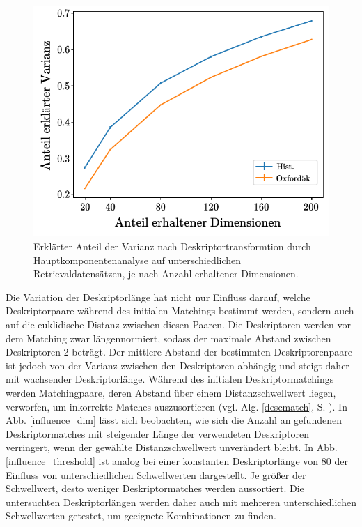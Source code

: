 \begin{figure}[h]
\centering
\includegraphics[scale=1]{explained_variance.pdf}
\caption{Erklärter Anteil der Varianz nach Deskriptortransformtion durch Hauptkomponentenanalyse auf unterschiedlichen Retrievaldatensätzen, je nach Anzahl erhaltener Dimensionen.}
\label{explained_variance_ratio}
\end{figure}
Die Variation der Deskriptorlänge hat nicht nur Einfluss darauf, welche Deskriptorpaare während des initialen Matchings bestimmt werden, sondern auch auf die euklidische Distanz zwischen diesen Paaren. Die Deskriptoren werden vor dem Matching zwar längennormiert, sodass der maximale Abstand zwischen Deskriptoren $2$ beträgt. Der mittlere Abstand der bestimmten Deskriptorenpaare ist jedoch von der Varianz zwischen den Deskriptoren abhängig und steigt daher mit wachsender Deskriptorlänge. Während des initialen Deskriptormatchings werden Matchingpaare, deren Abstand über einem Distanzschwellwert liegen, verworfen, um inkorrekte Matches auszusortieren (vgl. Alg. \ref{descmatch}, S. \pageref{descmatch}). In Abb. \ref{influence_dim} lässt sich beobachten, wie sich die Anzahl an gefundenen Deskriptormatches mit steigender Länge der verwendeten Deskriptoren verringert, wenn der gewählte Distanzschwellwert unverändert bleibt. In Abb. \ref{influence_threshold} ist analog bei einer konstanten Deskriptorlänge von $80$ der Einfluss von unterschiedlichen Schwellwerten dargestellt. Je größer der Schwellwert, desto weniger Deskriptormatches werden aussortiert. Die untersuchten Deskriptorlängen werden daher auch mit mehreren unterschiedlichen Schwellwerten getestet, um geeignete Kombinationen zu finden. 

